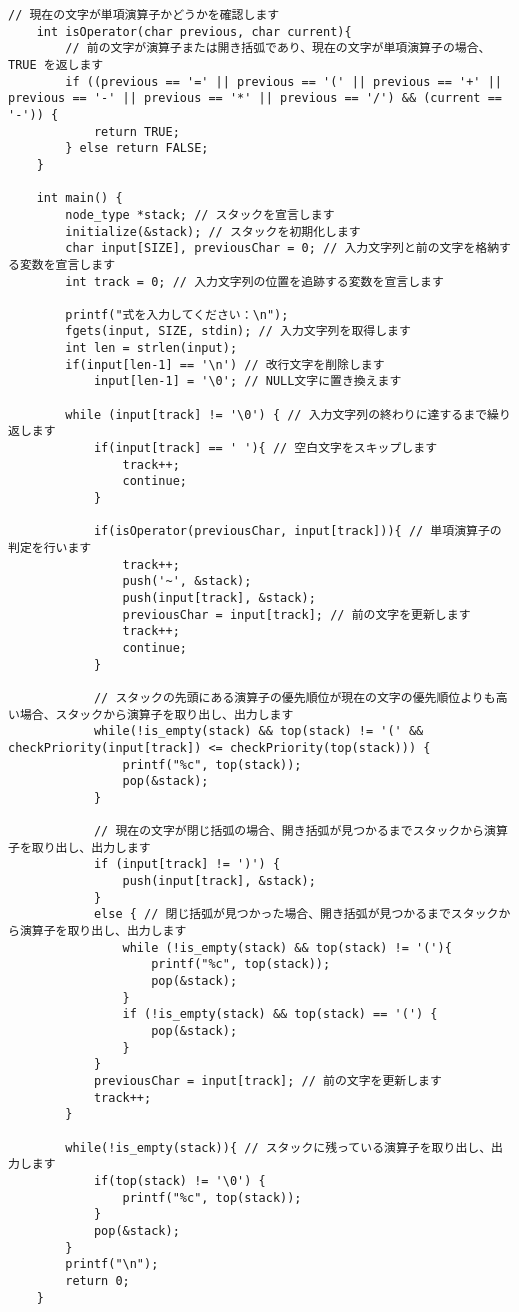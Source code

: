 \documentclass[]{jsarticle}
\begin{document}
\begin{lstlisting}[caption={reversePolishNotation.c}]
    // 現在の文字が単項演算子かどうかを確認します
    int isOperator(char previous, char current){
        // 前の文字が演算子または開き括弧であり、現在の文字が単項演算子の場合、TRUE を返します
        if ((previous == '=' || previous == '(' || previous == '+' || previous == '-' || previous == '*' || previous == '/') && (current == '-')) {
            return TRUE;
        } else return FALSE;
    }
    
    int main() {
        node_type *stack; // スタックを宣言します
        initialize(&stack); // スタックを初期化します
        char input[SIZE], previousChar = 0; // 入力文字列と前の文字を格納する変数を宣言します
        int track = 0; // 入力文字列の位置を追跡する変数を宣言します
    
        printf("式を入力してください：\n");
        fgets(input, SIZE, stdin); // 入力文字列を取得します
        int len = strlen(input); 
        if(input[len-1] == '\n') // 改行文字を削除します
            input[len-1] = '\0'; // NULL文字に置き換えます
    
        while (input[track] != '\0') { // 入力文字列の終わりに達するまで繰り返します
            if(input[track] == ' '){ // 空白文字をスキップします
                track++;
                continue;
            }
    
            if(isOperator(previousChar, input[track])){ // 単項演算子の判定を行います
                track++;
                push('~', &stack);
                push(input[track], &stack);
                previousChar = input[track]; // 前の文字を更新します
                track++;
                continue;
            }
    
            // スタックの先頭にある演算子の優先順位が現在の文字の優先順位よりも高い場合、スタックから演算子を取り出し、出力します
            while(!is_empty(stack) && top(stack) != '(' && checkPriority(input[track]) <= checkPriority(top(stack))) {
                printf("%c", top(stack));
                pop(&stack);
            }
    
            // 現在の文字が閉じ括弧の場合、開き括弧が見つかるまでスタックから演算子を取り出し、出力します
            if (input[track] != ')') {
                push(input[track], &stack);
            } 
            else { // 閉じ括弧が見つかった場合、開き括弧が見つかるまでスタックから演算子を取り出し、出力します
                while (!is_empty(stack) && top(stack) != '('){
                    printf("%c", top(stack));
                    pop(&stack);
                }
                if (!is_empty(stack) && top(stack) == '(') {
                    pop(&stack);
                }
            }
            previousChar = input[track]; // 前の文字を更新します
            track++;
        }
    
        while(!is_empty(stack)){ // スタックに残っている演算子を取り出し、出力します
            if(top(stack) != '\0') {
                printf("%c", top(stack));
            }
            pop(&stack);
        }
        printf("\n");
        return 0;
    }
\end{lstlisting}
\end{document}
